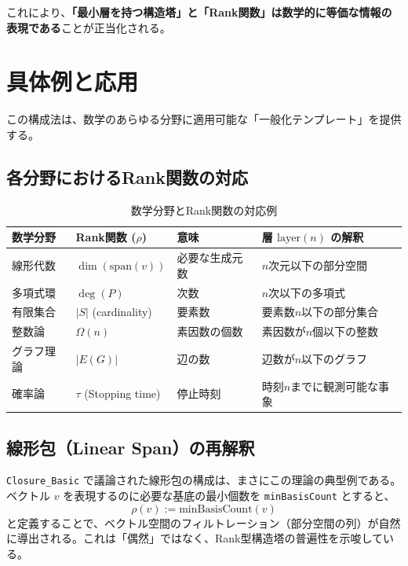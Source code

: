 \documentclass[report, paper=a4, fontsize=11pt, openany]{jlreq}
\newcommand{\layer}{\mathrm{layer}}
\newcommand{\rank}{\rho}
\begin{document}
これにより、\textbf{「最小層を持つ構造塔」と「Rank関数」は数学的に等価な情報の表現である}ことが正当化される。

\chapter{具体例と応用}

この構成法は、数学のあらゆる分野に適用可能な「一般化テンプレート」を提供する。

\section{各分野におけるRank関数の対応}

\begin{table}[htbp]
    \centering
    \caption{数学分野とRank関数の対応例}
    \label{tab:examples}
    \renewcommand{\arraystretch}{1.2}
    \begin{tabular}{@{}llll@{}}
        \toprule
        \textbf{数学分野} & \textbf{Rank関数 ($\rho$)} & \textbf{意味} & \textbf{層 $\layer(n)$ の解釈} \\ \midrule
        線形代数 & $\dim(\mathrm{span}(v))$ & 必要な生成元数 & $n$次元以下の部分空間 \\
        多項式環 & $\deg(P)$ & 次数 & $n$次以下の多項式 \\
        有限集合 & $|S|$ (cardinality) & 要素数 & 要素数$n$以下の部分集合 \\
        整数論 & $\Omega(n)$ & 素因数の個数 & 素因数が$n$個以下の整数 \\
        グラフ理論 & $|E(G)|$ & 辺の数 & 辺数が$n$以下のグラフ \\
        確率論 & $\tau$ (Stopping time) & 停止時刻 & 時刻$n$までに観測可能な事象 \\
        \bottomrule
    \end{tabular}
\end{table}

\section{線形包（Linear Span）の再解釈}

\texttt{Closure\_Basic} で議論された線形包の構成は、まさにこの理論の典型例である。ベクトル $v$ を表現するのに必要な基底の最小個数を \texttt{minBasisCount} とすると、
\[
    \rank(v) := \mathrm{minBasisCount}(v)
\]
と定義することで、ベクトル空間のフィルトレーション（部分空間の列）が自然に導出される。これは「偶然」ではなく、Rank型構造塔の普遍性を示唆している。
\end{document}
